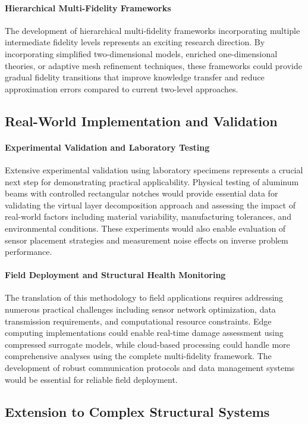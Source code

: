 \paragraph{Hierarchical Multi-Fidelity Frameworks}
The development of hierarchical multi-fidelity frameworks incorporating multiple intermediate fidelity levels represents an exciting research direction. By incorporating simplified two-dimensional models, enriched one-dimensional theories, or adaptive mesh refinement techniques, these frameworks could provide gradual fidelity transitions that improve knowledge transfer and reduce approximation errors compared to current two-level approaches.

\subsection{Real-World Implementation and Validation}
\paragraph{Experimental Validation and Laboratory Testing}
Extensive experimental validation using laboratory specimens represents a crucial next step for demonstrating practical applicability. Physical testing of aluminum beams with controlled rectangular notches would provide essential data for validating the virtual layer decomposition approach and assessing the impact of real-world factors including material variability, manufacturing tolerances, and environmental conditions. These experiments would also enable evaluation of sensor placement strategies and measurement noise effects on inverse problem performance.

\paragraph{Field Deployment and Structural Health Monitoring}
The translation of this methodology to field applications requires addressing numerous practical challenges including sensor network optimization, data transmission requirements, and computational resource constraints. Edge computing implementations could enable real-time damage assessment using compressed surrogate models, while cloud-based processing could handle more comprehensive analyses using the complete multi-fidelity framework. The development of robust communication protocols and data management systems would be essential for reliable field deployment.

\subsection{Extension to Complex Structural Systems}
